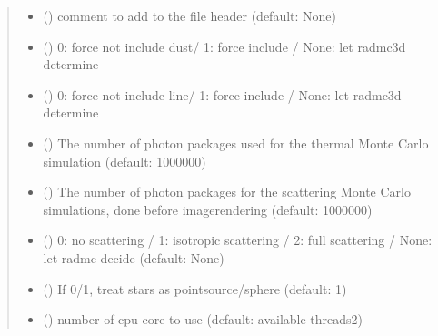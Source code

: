 \documentclass[a4paper,11pt,english]{sphinxmanual}
\begin{document}
\begin{fulllineitems}
\begin{fulllineitems}
\begin{quote}
\begin{description}
\begin{itemize}
\item {} 
\sphinxAtStartPar
{} () \textendash{} comment to add to the file header (default: None)

\item {} 
\sphinxAtStartPar
{} () \textendash{} 0: force not include dust/ 1: force include / None: let radmc3d determine

\item {} 
\sphinxAtStartPar
{} () \textendash{} 0: force not include line/ 1: force include / None: let radmc3d determine

\item {} 
\sphinxAtStartPar
{} () \textendash{} The number of photon packages used for the thermal Monte Carlo simulation (default: 1000000)

\item {} 
\sphinxAtStartPar
{} () \textendash{} The number of photon packages for the scattering Monte Carlo simulations, done before image\sphinxhyphen{}rendering (default: 1000000)

\item {} 
\sphinxAtStartPar
{} () \textendash{} 0: no scattering / 1: isotropic scattering / 2: full scattering / None: let radmc decide (default: None)

\item {} 
\sphinxAtStartPar
{} () \textendash{} If 0/1, treat stars as point\sphinxhyphen{}source/sphere (default: 1)

\item {} 
\sphinxAtStartPar
{} () \textendash{} number of cpu core to use (default: available threads\sphinxhyphen{}2)

\end{itemize}


\end{description}
\end{quote}
\end{fulllineitems}
\end{fulllineitems}
\end{document}
